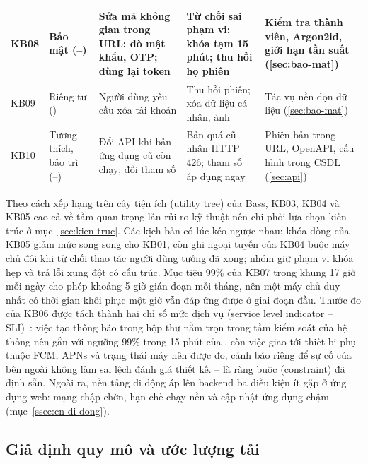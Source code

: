 {\begin{longtable}{|C{1.0cm}|L{2.2cm}|L{3.6cm}|L{3.3cm}|L{\dimexpr{}\arrayrulewidth-1.0cm-2.2cm-3.6cm-3.3cm\relax}|}
KB08 & Bảo mật (--) & Sửa mã không gian trong URL; dò mật khẩu, OTP; dùng lại token & Từ chối sai phạm vi; khóa tạm 15 phút; thu hồi họ phiên & Kiểm tra thành viên, Argon2id, giới hạn tần suất (\ref{sec:bao-mat})\\ \hline
KB09 & Riêng tư () & Người dùng yêu cầu xóa tài khoản & Thu hồi phiên; xóa dữ liệu cá nhân, ảnh & Tác vụ nền dọn dữ liệu (\ref{sec:bao-mat})\\ \hline
KB10 & Tương thích, bảo trì (--) & Đổi API khi bản ứng dụng cũ còn chạy; đổi tham số & Bản quá cũ nhận HTTP 426; tham số áp dụng ngay & Phiên bản trong URL, OpenAPI, cấu hình trong CSDL (\ref{sec:api})\\ \hline
\end{longtable}
}

Theo cách xếp hạng trên cây tiện ích (utility tree) của Bass, KB03, KB04 và KB05 cao cả về tầm quan trọng lẫn rủi ro kỹ thuật nên chi phối lựa chọn kiến trúc ở mục~\ref{sec:kien-truc}. Các kịch bản có lúc kéo ngược nhau: khóa dòng của KB05 giảm mức song song cho KB01, còn ghi ngoại tuyến của KB04 buộc máy chủ đôi khi từ chối thao tác người dùng tưởng đã xong; nhóm giữ phạm vi khóa hẹp và trả lỗi xung đột có cấu trúc. Mục tiêu 99\% của KB07 trong khung 17 giờ mỗi ngày cho phép khoảng 5 giờ gián đoạn mỗi tháng, nên một máy chủ duy nhất có thời gian khôi phục một giờ vẫn đáp ứng được ở giai đoạn đầu. Thước đo của KB06 được tách thành hai chỉ số mức dịch vụ (service level indicator – SLI)~\cite{sre}: việc tạo thông báo trong hộp thư nằm trọn trong tầm kiểm soát của hệ thống nên gắn với ngưỡng 99\% trong 15 phút của , còn việc giao tới thiết bị phụ thuộc FCM, APNs và trạng thái máy nên được đo, cảnh báo riêng để sự cố của bên ngoài không làm sai lệch đánh giá thiết kế. -- là ràng buộc (constraint) đã định sẵn. Ngoài ra, nền tảng di động áp lên backend ba điều kiện ít gặp ở ứng dụng web: mạng chập chờn, hạn chế chạy nền và cập nhật ứng dụng chậm (mục~\ref{ssec:cn-di-dong}).

\subsection{Giả định quy mô và ước lượng tải}\label{ssec:uoc-luong-tai}

